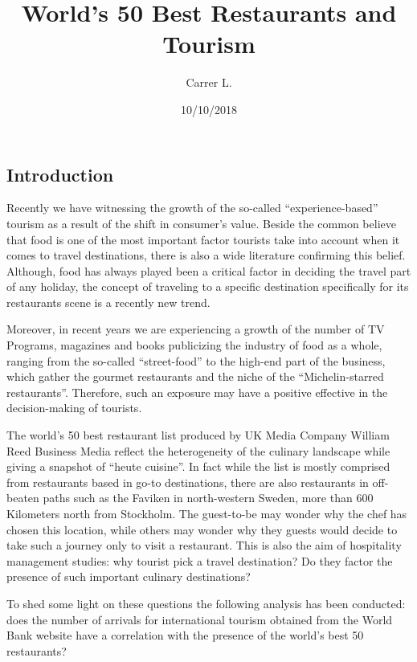 \documentclass[]{article}
\title{World's 50 Best Restaurants and Tourism}
\author{Carrer L.}
\date{10/10/2018}
\begin{document}
\maketitle



\subsection{Introduction}


Recently we have witnessing the growth of the so-called ``experience-based'' tourism as a result of the shift in consumer's value. Beside the common believe that food is one of the most important factor tourists take into account when it comes to travel destinations, there is also a wide literature confirming this belief. Although, food has always played been a critical factor in deciding the travel part of any holiday, the concept of traveling to a specific destination specifically for its restaurants scene is a recently new trend. 

Moreover, in recent years we are experiencing a growth of the number of TV Programs, magazines and books publicizing the industry of food as a whole, ranging from the so-called ``street-food'' to the high-end part of the business, which gather the gourmet restaurants and the niche of the ``Michelin-starred restaurants''. Therefore, such an exposure may have a positive effective in the decision-making of tourists.

The world's 50 best restaurant list produced by UK Media Company William Reed Business Media reflect the heterogeneity of the culinary landscape while giving a snapshot of ``heute cuisine''. In fact while the list is mostly comprised from restaurants based in go-to destinations, there are also restaurants in off-beaten paths such as the Faviken in north-western Sweden, more than 600 Kilometers north from Stockholm. The guest-to-be may wonder why the chef has chosen this location, while others may wonder why they guests would decide to take such a journey only to visit a restaurant. This is also the aim of hospitality management studies: why tourist pick a travel destination? Do they factor the presence of such important culinary destinations?

To shed some light on these questions the following analysis has been conducted: does the number of arrivals for international tourism obtained from the World Bank website have a correlation with the presence of the world's best 50 restaurants? 
\end{document}
